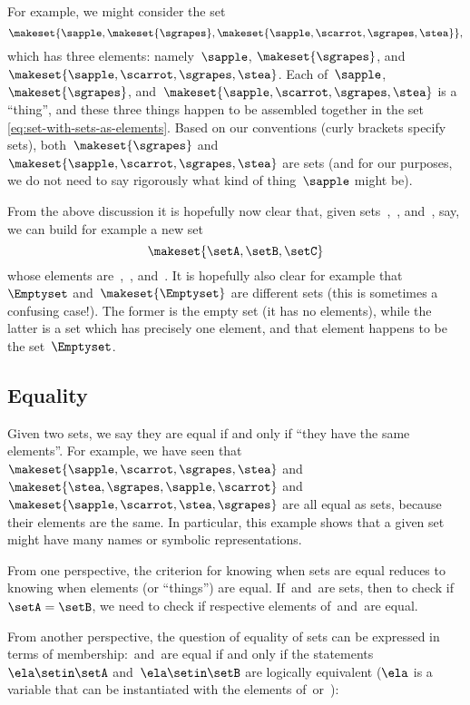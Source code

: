 For example, we might consider the set
%
\begin{equation}
    \label{eq:set-with-sets-as-elements}
    \makeset{ \sapple, \makeset{ \sgrapes }, \makeset{ \sapple, \scarrot, \sgrapes, \stea } },
\end{equation}
%
which has three elements: namely~$\sapple$, $\makeset{ \sgrapes }$, and~$\makeset{ \sapple, \scarrot, \sgrapes, \stea }$.
Each of~$\sapple$, $\makeset{ \sgrapes }$, and~$\makeset{ \sapple, \scarrot, \sgrapes, \stea }$ is a ``thing'', and these three things happen to be assembled together in the set \cref{eq:set-with-sets-as-elements}.
Based on our conventions (curly brackets specify sets), both~$\makeset{ \sgrapes }$ and~$\makeset{ \sapple, \scarrot, \sgrapes, \stea }$ are sets (and for our purposes, we do not need to say rigorously what kind of thing~$\sapple$ might be).

From the above discussion it is hopefully now clear that, given sets~\setA,~\setB, and~\setC, say, we can build for example a new set
\begin{equation}
    \makeset{ \setA, \setB, \setC }
\end{equation}
whose elements are~\setA,~\setB, and~\setC.
It is hopefully also clear for example that~$\Emptyset$ and~$\makeset{ \Emptyset }$ are different sets (this is sometimes a confusing case!).
The former is the empty set (it has no elements), while the latter is a set which has precisely one element, and that element happens to be the set~$\Emptyset$.

\subsection{Equality}

Given two sets, we say they are equal if and only if ``they have the same elements''.
For example, we have seen that~$\makeset{ \sapple, \scarrot, \sgrapes, \stea }$ and~$\makeset{ \stea, \sgrapes, \sapple, \scarrot}$ and~$\makeset{ \sapple, \scarrot, \stea, \sgrapes }$ are all equal as sets, because their elements are the same.
In particular, this example shows that a given set might have many names or symbolic representations.

From one perspective, the criterion for knowing when sets are equal reduces to knowing when elements (or ``things'') are equal.
If~\setA and~\setB are sets, then to check if~$\setA = \setB$, we need to check if respective elements of~\setA and~\setB are equal.

From another perspective, the question of equality of sets can be expressed in terms of membership:~\setA and~\setB are equal if and only if the statements~$\ela \setin\setA$ and~$\ela \setin\setB$ are logically equivalent ($\ela$ is a variable that can be instantiated with the elements of~\setA or~\setB):

